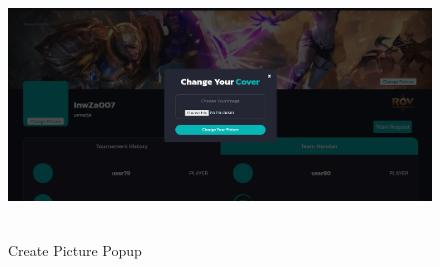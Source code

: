     \begin{figure}[ht]
      \begin{center}
      \includegraphics[width=18cm,height=7cm,keepaspectratio]{team_each_change_pic.png}
      \end{center}
      \caption[Create Picture Popup]{Create Picture Popup}
      \label{fig:Change Picture Popup}
    \end{figure}

